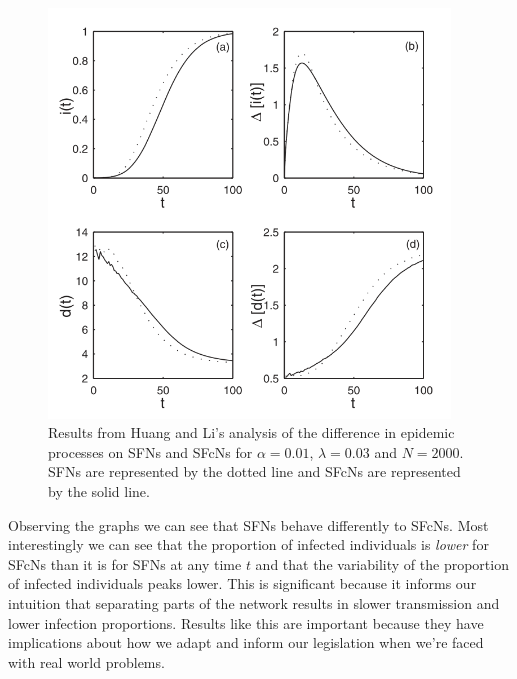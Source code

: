 \begin{figure}
    \begin{center}
        \includegraphics[width=0.95\textwidth]{img/si}
    \end{center}
    \caption{Results from Huang and Li's analysis of the difference in epidemic processes on SFNs and SFcNs for $\alpha = 0.01$, $\lambda = 0.03$ and $N = 2000$. SFNs are represented by the dotted line and SFcNs are represented by the solid line.}
    \label{fig:si}
\end{figure}

Observing the graphs we can see that SFNs behave differently to SFcNs. Most interestingly we can see that the proportion of infected individuals is \emph{lower} for SFcNs than it is for SFNs at any time $t$ and that the variability of the proportion of infected individuals peaks lower. This is significant because it informs our intuition that separating parts of the network results in slower transmission and lower infection proportions. Results like this are important because they have implications about how we adapt and inform our legislation when we're faced with real world problems.
